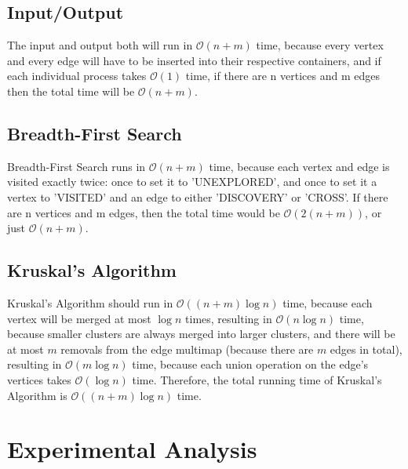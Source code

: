 \documentclass[titlepage]{article}
\begin{document}
\begin{multicols*}{2}
			\subsection{Input/Output}
                        The input and output both will run in $\mathcal{O}(n+m)$ time, because every vertex and every edge will have to be inserted into their respective containers, and if each individual process takes $\mathcal{O}(1)$ time, if there are n vertices and m edges then the total time will be $\mathcal{O}(n+m)$.
			\subsection{Breadth-First Search}
                        Breadth-First Search runs in $\mathcal{O}(n+m)$ time, because each vertex and edge is visited exactly twice: once to set it to 'UNEXPLORED', and once to set it a vertex to 'VISITED' and an edge to either 'DISCOVERY' or 'CROSS'. If there are n vertices and m edges, then the total time would be $\mathcal{O}(2(n+m))$, or just $\mathcal{O}(n+m)$.
	               \subsection{Kruskal's Algorithm}
                Kruskal's Algorithm should run in $\mathcal{O}((n+m)\log{n})$ time, because each vertex will be merged at most $\log{n}$ times, resulting in $\mathcal{O}(n\log{n})$ time, because smaller clusters are always merged into larger clusters, and there will be at most $m$ removals from the edge multimap (because there are $m$ edges in total), resulting in $\mathcal{O}(m\log{n})$ time, because each union operation on the edge's vertices takes $\mathcal{O}(\log{n})$ time. Therefore, the total running time of Kruskal's Algorithm is $\mathcal{O}((n+m)\log{n})$ time.
        \section{Experimental Analysis}

\end{multicols*}
\end{document}
